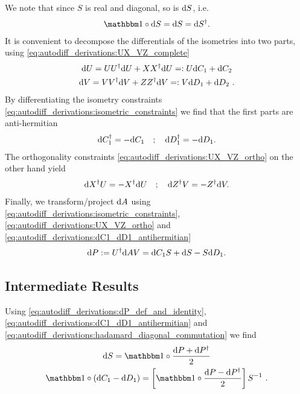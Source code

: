 We note that since $S$ is real and diagonal, so is $\mathrm{d}{S}$, i.e.
\begin{align}
    \label{eq:autodiff_derivations:dS_real_diagonal}
    \eye\hadamard\dS = \dS = \dS^{\dagger}
    .
\end{align}
It is convenient to decompose the differentials of the isometries into two parts, using \eqref{eq:autodiff_derivations:UX_VZ_complete}
\begin{gather}
    \mathrm{d}{U} = UU^{\dagger}\mathrm{d}{U} + XX^{\dagger}\mathrm{d}{U} =: U\mathrm{d}{C}_1 + \mathrm{d}{C}_2
    \label{eq:autodiff_derivations:decompose_dU_def_dC12}
    \\
    \mathrm{d}{V} = VV^{\dagger}\mathrm{d}{V} + ZZ^{\dagger}\mathrm{d}{V} =: V\mathrm{d}{D}_1 + \mathrm{d}{D}_2
    \label{eq:autodiff_derivations:decompose_dV_def_dD12}
    ~.
\end{gather}
By differentiating the isometry constraints \eqref{eq:autodiff_derivations:isometric_constraints} we find that the first parts are anti-hermitian
\begin{gather}
    \mathrm{d}{C}_1^{\dagger} = -\mathrm{d}{C}_1
    \quad;\quad
    \mathrm{d}{D}_1^{\dagger} = -\mathrm{d}{D}_1
    .
    \label{eq:autodiff_derivations:dC1_dD1_antihermitian}
\end{gather}
The orthogonality constraints \eqref{eq:autodiff_derivations:UX_VZ_ortho} on the other hand yield
\begin{gather}
    \mathrm{d}{X}^{\dagger} U = - X^{\dagger} \mathrm{d}{U}
    \quad ; \quad
    \mathrm{d}{Z}^{\dagger} V = - Z^{\dagger} \mathrm{d}{V}
    .
    \label{eq:autodiff_derivations:diff_ortho_constraint}
\end{gather}
Finally, we transform/project $\mathrm{d}{A}$ using \eqref{eq:autodiff_derivations:isometric_constraints}, \eqref{eq:autodiff_derivations:UX_VZ_ortho} and \eqref{eq:autodiff_derivations:dC1_dD1_antihermitian}
\begin{gather}
    \mathrm{d}{P} := U^{\dagger} \mathrm{d}{A} V = \mathrm{d}{C}_1 S + \mathrm{d}{S} - S\mathrm{d}{D}_1
    .
    \label{eq:autodiff_derivations:dP_def_and_identity}
\end{gather}


\subsection{Intermediate Results}
\label{subsec:autodiff_derivation:svd:intermediate_results}

Using \eqref{eq:autodiff_derivations:dP_def_and_identity}, \eqref{eq:autodiff_derivations:dC1_dD1_antihermitian} and \eqref{eq:autodiff_derivations:hadamard_diagonal_commutation} we find
\begin{gather}
    \dS = \eye\hadamard\frac{\dP + \dP^{\dagger}}{2}
    \label{eq:autodiff_derivations:dS_result}
    \\
    \eye\hadamard\rBr{\dC_1 - \dD_1} = \sBr{\eye\hadamard\frac{\dP - \dP^{\dagger}}{2}}S^{-1}
    ~.
    \label{eq:autodiff_derivations:dC1-dD2_diag_result}
\end{gather}

